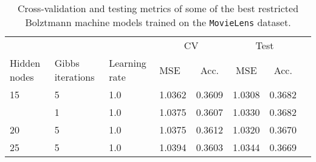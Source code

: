 \begin{table}[H]
\centering
\begin{tabular}{llllcccc}
\toprule
     &     &      & \multicolumn{2}{c}{CV} & \multicolumn{2}{c}{Test}\\
     \cmidrule(lr){4-5}\cmidrule(lr){6-7}
Hidden nodes & Gibbs iterations  & Learning rate &    MSE & Acc. & MSE & Acc.  \\
\midrule
15 & 5 & 1.0 &   1.0362 &      0.3609 &   1.0308 &        0.3682 \\
   & 1 & 1.0 &   1.0375 &      0.3607 &   1.0330 &        0.3682 \\
20 & 5 & 1.0 &   1.0375 &      0.3612 &   1.0320 &        0.3670 \\
25 & 5 & 1.0 &   1.0394 &      0.3603 &   1.0344 &        0.3669 \\
\bottomrule
\end{tabular}
\caption{Cross-validation and testing metrics of some of the best restricted Bolztmann machine models trained on the \texttt{MovieLens} dataset.}
\label{tab:results.rbm}
\end{table}
